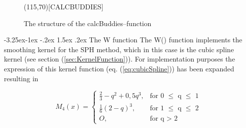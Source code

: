 \documentclass{report}
\makeatletter
\renewcommand\paragraph{\@startsection{paragraph}{4}{\z@}%
  {-3.25ex\@plus -1ex \@minus -.2ex}%
  {1.5ex \@plus .2ex}%
  {\normalfont\normalsize\bfseries}}
\makeatother
\begin{document}
\begin{figure}[H]
\label{fig:CalcBuddies_structure}  

\begin{center}
\begin{struktogramm}(115,70)[CALCBUDDIES]
        \change
        \ifend
      \change
      \ifend
    \whileend
  \whileend
\end{struktogramm}
\end{center}

\caption{The structure of the calcBuddies--function}
\end{figure}


\paragraph{The W function}
The W() function implements the smoothing kernel for the SPH method, which in this case is the cubic spline kernel (see section (\ref{sec:KernelFunction})). For implementation purposes the expression of this kernel function (eq. (\ref{eq:cubicSpline})) has been expanded resulting in

\begin{equation}
\label{eq:cubicSplineImplement}
M_{4}(x)=\begin{cases}
\frac{2}{3}-q^{2}+0,5q^{3},& \text{for 0 $\leq$ q $\leq$ 1} \\
\frac{1}{6}(2-q)^{3},&  \text{for 1 $\leq$ q $\leq$ 2} \\
O,& \text{for q $>$ 2}
\end{cases}
\end{equation}
\end{document}
